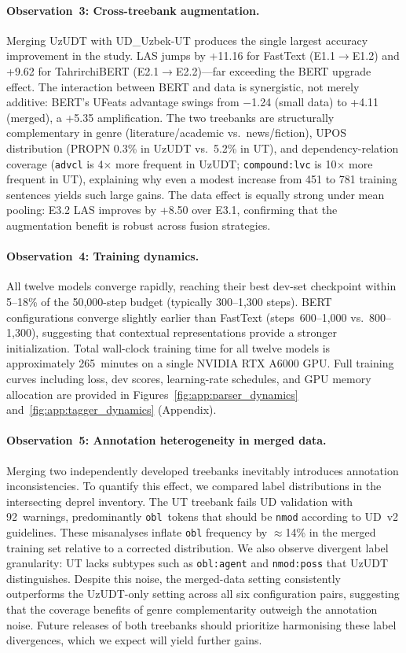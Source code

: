 \documentclass[runningheads]{llncs}
\begin{document}
\paragraph{Observation~3: Cross-treebank augmentation.}
Merging UzUDT with UD\_Uzbek-UT produces the single largest accuracy improvement in the study.
LAS jumps by +11.16 for FastText (E1.1$\to$E1.2) and +9.62 for TahrirchiBERT (E2.1$\to$E2.2)---far exceeding the BERT upgrade effect.
The interaction between BERT and data is synergistic, not merely additive: BERT's UFeats advantage swings from $-$1.24 (small data) to +4.11 (merged), a +5.35 amplification.
The two treebanks are structurally complementary in genre (literature/academic vs.\ news/fiction), UPOS distribution (PROPN 0.3\% in UzUDT vs.\ 5.2\% in UT), and dependency-relation coverage (\texttt{advcl} is 4$\times$ more frequent in UzUDT; \texttt{compound:lvc} is 10$\times$ more frequent in UT), explaining why even a modest increase from 451 to 781 training sentences yields such large gains.
The data effect is equally strong under mean pooling: E3.2 LAS improves by +8.50 over E3.1, confirming that the augmentation benefit is robust across fusion strategies.

\paragraph{Observation~4: Training dynamics.}
All twelve models converge rapidly, reaching their best dev-set checkpoint within 5--18\% of the 50{,}000-step budget (typically 300--1{,}300 steps).
BERT configurations converge slightly earlier than FastText (steps~600--1{,}000 vs.\ 800--1{,}300), suggesting that contextual representations provide a stronger initialization.
Total wall-clock training time for all twelve models is approximately 265~minutes on a single NVIDIA RTX A6000 GPU.
Full training curves including loss, dev scores, learning-rate schedules, and GPU memory allocation are provided in Figures~\ref{fig:app:parser_dynamics} and~\ref{fig:app:tagger_dynamics} (Appendix).

\paragraph{Observation~5: Annotation heterogeneity in merged data.}
Merging two independently developed treebanks inevitably introduces annotation inconsistencies.
To quantify this effect, we compared label distributions in the intersecting deprel inventory.
The UT treebank fails UD validation with 92~warnings, predominantly \texttt{obl}~tokens that should be \texttt{nmod} according to UD~v2 guidelines.
These misanalyses inflate \texttt{obl} frequency by ${\approx}$14\% in the merged training set relative to a corrected distribution.
We also observe divergent label granularity: UT lacks subtypes such as \texttt{obl:agent} and \texttt{nmod:poss} that UzUDT distinguishes.
Despite this noise, the merged-data setting consistently outperforms the UzUDT-only setting across all six configuration pairs, suggesting that the coverage benefits of genre complementarity outweigh the annotation noise.
Future releases of both treebanks should prioritize harmonising these label divergences, which we expect will yield further gains.
\end{document}
